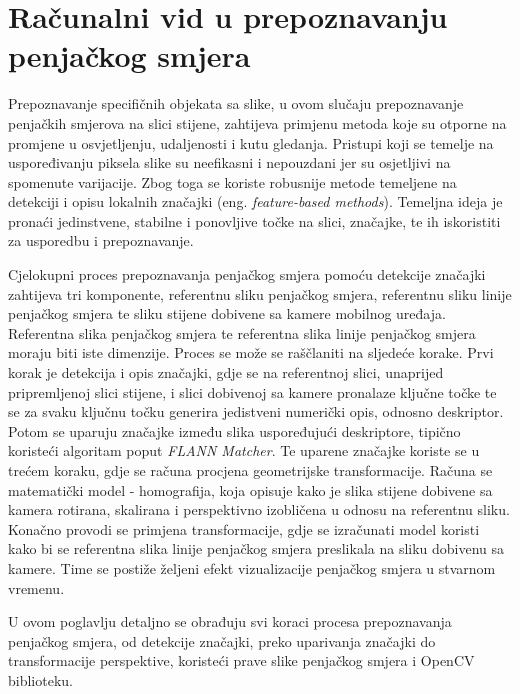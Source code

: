 \chapter{Računalni vid u prepoznavanju penjačkog smjera}

Prepoznavanje specifičnih objekata sa slike, u ovom slučaju prepoznavanje penjačkih smjerova na slici stijene, zahtijeva primjenu metoda koje su otporne na promjene u osvjetljenju, udaljenosti i kutu gledanja. Pristupi koji se temelje na uspoređivanju piksela slike su neefikasni i nepouzdani jer su osjetljivi na spomenute varijacije. Zbog toga se koriste robusnije metode temeljene na detekciji i opisu lokalnih značajki (eng. \textit{feature-based methods}). Temeljna ideja je pronaći jedinstvene, stabilne i ponovljive točke na slici, značajke, te ih iskoristiti za usporedbu i prepoznavanje.

Cjelokupni proces prepoznavanja penjačkog smjera pomoću detekcije značajki zahtijeva tri komponente, referentnu sliku penjačkog smjera, referentnu sliku linije penjačkog smjera te sliku stijene dobivene sa kamere mobilnog uređaja. Referentna slika penjačkog smjera te referentna slika linije penjačkog smjera moraju biti iste dimenzije. Proces se može se raščlaniti na sljedeće korake.
Prvi korak je detekcija i opis značajki, gdje se na referentnoj slici, unaprijed pripremljenoj slici stijene, i slici dobivenoj sa kamere pronalaze ključne točke te se za svaku ključnu točku generira jedistveni numerički opis, odnosno deskriptor. Potom se uparuju značajke između slika uspoređujući deskriptore, tipično koristeći algoritam poput \textit{FLANN Matcher}. 
Te uparene značajke koriste se u trećem koraku, gdje se računa procjena geometrijske transformacije. Računa se matematički model - homografija, koja opisuje kako je slika stijene dobivene sa kamera rotirana, skalirana i perspektivno izobličena u odnosu na referentnu sliku. Konačno provodi se primjena transformacije, gdje se izračunati model koristi kako bi se referentna slika linije penjačkog smjera preslikala na sliku dobivenu sa kamere. Time se postiže željeni efekt vizualizacije penjačkog smjera u stvarnom vremenu.

U ovom poglavlju detaljno se obrađuju svi koraci procesa prepoznavanja penjačkog smjera, od detekcije značajki, preko uparivanja značajki do transformacije perspektive, koristeći prave slike penjačkog smjera i OpenCV biblioteku.



